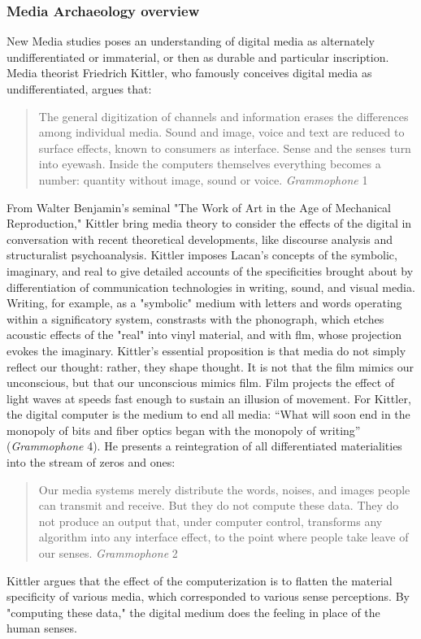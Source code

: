 \documentclass[11pt]{article}
\begin{document}
\subsubsection{Media Archaeology overview}
\label{sec:org8f56daf}
New Media studies poses an understanding of digital media as
alternately undifferentiated or immaterial, or then as durable and
particular inscription. Media theorist Friedrich Kittler, who famously
conceives digital media as undifferentiated, argues that:
\begin{quote}
The general digitization of channels and information erases the
differences among individual media. Sound and image, voice and text
are reduced to surface effects, known to consumers as interface. Sense
and the senses turn into eyewash. Inside the computers themselves
everything becomes a number: quantity without image, sound or
voice. \emph{Grammophone} 1
\end{quote}
From Walter Benjamin's seminal "The Work of Art in the Age of
Mechanical Reproduction," Kittler bring media theory to consider the
effects of the digital in conversation with recent theoretical
developments, like discourse analysis and structuralist
psychoanalysis. Kittler imposes Lacan's concepts of the symbolic,
imaginary, and real to give detailed accounts of the specificities
brought about by differentiation of communication technologies in
writing, sound, and visual media. Writing, for example, as a
"symbolic" medium with letters and words operating within a
significatory system, constrasts with the phonograph, which etches
acoustic effects of the "real" into vinyl material, and with flm,
whose projection evokes the imaginary. Kittler's essential proposition
is that media do not simply reflect our thought: rather, they shape
thought. It is not that the film mimics our unconscious, but that our
unconscious mimics film. Film projects the effect of light waves at
speeds fast enough to sustain an illusion of movement. For Kittler,
the digital computer is the medium to end all media: “What will soon
end in the monopoly of bits and fiber optics began with the monopoly
of writing” (\emph{Grammophone} 4). He presents a reintegration of all
differentiated materialities into the stream of zeros and ones:
\begin{quote}
Our media systems merely distribute the words, noises, and images
people can transmit and receive. But they do not compute these
data. They do not produce an output that, under computer control,
transforms any algorithm into any interface effect, to the point where
people take leave of our senses. \emph{Grammophone} 2
\end{quote}
Kittler argues that the effect of the computerization is to flatten
the material specificity of various media, which corresponded to
various sense perceptions. By "computing these data," the digital
medium does the feeling in place of the human senses.
\end{document}
